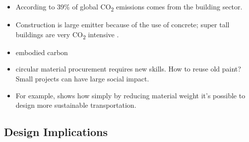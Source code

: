 \documentclass[
  letterpaper,
  DIV=11,
  numbers=noendperiod]{scrartcl}
\providecommand{\tightlist}{%
  \setlength{\itemsep}{0pt}\setlength{\parskip}{0pt}}\usepackage{longtable,booktabs,array}
\begin{document}
\begin{itemize}
\tightlist
\item
  According to \citet{debnathSocialMediaEnables2022} 39\% of global
  CO\textsubscript{2} emissions comes from the building sector.
\item
  Construction is large emitter because of the use of concrete; super
  tall buildings are very CO\textsubscript{2} intensive
  \citep{zhaoEmbodiedCarbonBased2015}.
\item
  embodied carbon
\item
  \citet{oikosdenktankWebinarDoughnutEconomics2021} circular material
  procurement requires new skills. How to reuse old paint? Small
  projects can have large social impact.
\item
  For example, \citet{DURIEZ2022454} shows how simply by reducing
  material weight it's possible to design more sustainable
  transportation.
\end{itemize}

\subsection{Design Implications}\label{design-implications-2}
\end{document}
